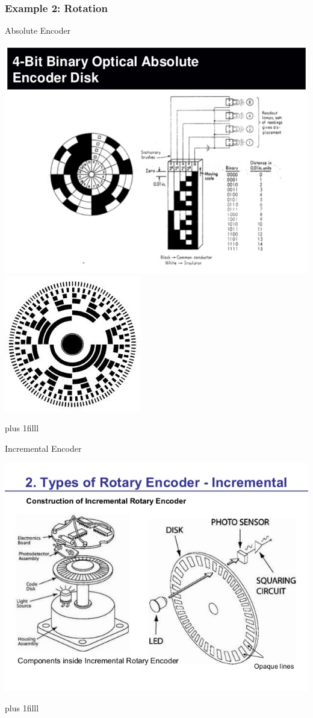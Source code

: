 \documentclass[fleqn]{beamer} %
\newcommand{\sectionIsubsectionIIItitle}{Example 2: Rotation}
\newcommand{\btVFill}{\vskip0pt plus 1filll}
\begin{document}
			\begin{frame}
				\frametitle{\sectionIsubsectionIIItitle}

				Absolute Encoder  
	
				\includegraphics[scale=.35]{images/lecture1_fig1.jpg}	
				\includegraphics[scale=.25]{images/lecture1_fig2.jpg}

				\btVFill
				
			\end{frame}

			\begin{frame}

				Incremental Encoder  
	
				\includegraphics[scale=.35]{images/lecture1_fig3.jpg}	
	

				\btVFill
			\end{frame}
\end{document}
